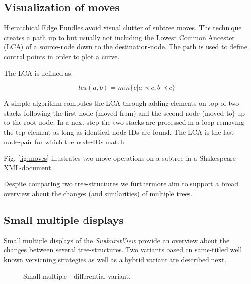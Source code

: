 \subsection{Visualization of moves}
Hierarchical Edge Bundles\cite{Bundles} avoid visual clutter of subtree moves. The technique creates a path up to but usually not including the Lowest Common Ancestor (LCA) of a source-node down to the destination-node. The path is used to define control points in order to plot a curve.

The LCA is defined as:

\begin{equation}
lca(a{,} b) = min\{c|a \prec c, b \prec c\}
\end{equation}

A simple algorithm computes the LCA through adding elements on top of two stacks following the first node (moved from) and the second node (moved to) up to the root-node. In a next step the two stacks are processed in a loop removing the top element as long as identical node-IDs are found. The LCA is the last node-pair for which the node-IDs match.

Fig. \ref{fig:moves} illustrates two move-operations on a subtree in a Shakespeare XML-document.

Despite comparing two tree-structures we furthermore aim to support a broad overview about the changes (and similarities) of multiple trees.

\subsection{Small multiple displays}\label{subsec::smallmultiple}
Small multiple displays of the \emph{SunburstView} provide an overview about the changes between several tree-structures. Two variants based on same-titled well known versioning strategies as well as a hybrid variant are described next.

\begin{figure}[tb]
\caption{\label{fig:smallmultiple-differential} Small multiple - differential variant.}
\end{figure}

